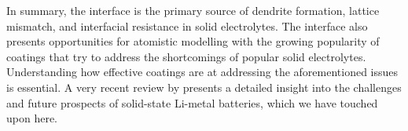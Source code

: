 \documentclass[../main.tex]{subfiles}
\begin{document}
In summary, the interface is the primary source of dendrite formation, lattice mismatch, and interfacial resistance in solid electrolytes. The interface also presents opportunities for atomistic modelling with the growing popularity of coatings that try to address the shortcomings of popular solid electrolytes.\cite{Kim2020, Xu2018exp, Chen2020se_coat, Ito2017, Yin2020, Ji2020coating, Li2020coating, Yi2021coating, Dai2021coating, Pan2020coating, Jing2020coating, Wang2021coating, Zhao2020coating, Zhao2021coating, Liang2020coating, Zhang2020coating} Understanding how effective coatings are at addressing the aforementioned issues is essential. \cite{Zhang2020directvis, Xiao2019coat, Tian2018} A very recent review by \citeauthor{kim2021solid} presents a detailed insight into the challenges and future prospects of solid-state Li-metal batteries, which we have touched upon here.\cite{kim2021solid}
\end{document}

